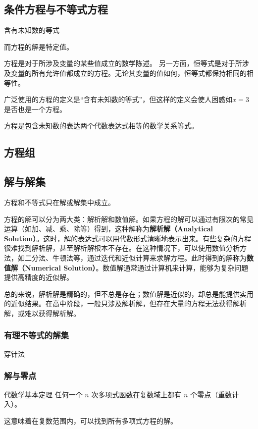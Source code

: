 \subsection{条件方程与不等式方程}

含有未知数的等式


而方程的解是特定值。


方程是对于所涉及变量的某些值成立的数学陈述。
另一方面，恒等式是对于所涉及变量的所有允许值都成立的方程。无论其变量的值如何，恒等式都保持相同的相等性。

广泛使用的方程的定义是“含有未知数的等式”，但这样的定义会使人困惑如$x=3$是否也是一个方程。

方程是包含未知数的表达两个代数表达式相等的数学关系等式。


\subsection{方程组}

\subsection{解与解集}

方程和不等式只在解或解集中成立。

方程的解可以分为两大类：解析解和数值解。如果方程的解可以通过有限次的常见运算（如加、减、乘、除等）得到，这种解称为\textbf{解析解（Analytical Solution）}。这时，解的表达式可以用代数形式清晰地表示出来。有些复杂的方程很难找到解析解，甚至解析解根本不存在。在这种情况下，可以使用数值分析方法，如二分法、牛顿法等，通过迭代和近似计算来求解方程。此时得到的解称为\textbf{数值解（Numerical Solution）}。数值解通常通过计算机来计算，能够为复杂问题提供高精度的近似解。

总的来说，解析解是精确的，但不总是存在；数值解是近似的，却总是能提供实用的近似结果。在高中阶段，一般只涉及解析解，但存在大量的方程无法获得解析解，或难以获得解析解。

\subsubsection{有理不等式的解集}

穿针法

\subsubsection{解与零点}

\begin{definition}{代数学基本定理}
任何一个 $n$ 次多项式函数在复数域上都有 $n$ 个零点（重数计入）。
\end{definition}
这意味着在复数范围内，可以找到所有多项式方程的解。



